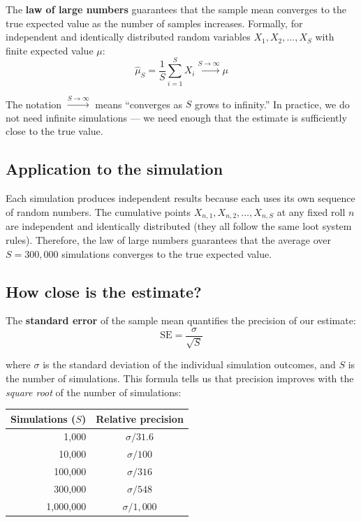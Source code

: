 \documentclass[11pt,a4paper]{article}
\theoremstyle{remark}
\begin{document}
The \textbf{law of large numbers} guarantees that the sample mean converges to the true expected value as the number of samples increases. Formally, for independent and identically distributed random variables $X_1, X_2, \ldots, X_S$ with finite expected value $\mu$:
\[
\hat{\mu}_S = \frac{1}{S} \sum_{i=1}^{S} X_i \xrightarrow{S \to \infty} \mu
\]

The notation $\xrightarrow{S \to \infty}$ means ``converges as $S$ grows to infinity.'' In practice, we do not need infinite simulations --- we need enough that the estimate is sufficiently close to the true value.

\subsection{Application to the simulation}

Each simulation produces independent results because each uses its own sequence of random numbers. The cumulative points $X_{n,1}, X_{n,2}, \ldots, X_{n,S}$ at any fixed roll $n$ are independent and identically distributed (they all follow the same loot system rules). Therefore, the law of large numbers guarantees that the average over $S = 300{,}000$ simulations converges to the true expected value.

\subsection{How close is the estimate?}

The \textbf{standard error} of the sample mean quantifies the precision of our estimate:
\[
\text{SE} = \frac{\sigma}{\sqrt{S}}
\]

where $\sigma$ is the standard deviation of the individual simulation outcomes, and $S$ is the number of simulations. This formula tells us that precision improves with the \emph{square root} of the number of simulations:

\begin{center}
\begin{tabular}{@{}rc@{}}
\toprule
Simulations ($S$) & Relative precision \\
\midrule
1{,}000    & $\sigma / 31.6$ \\
10{,}000   & $\sigma / 100$ \\
100{,}000  & $\sigma / 316$ \\
300{,}000  & $\sigma / 548$ \\
1{,}000{,}000 & $\sigma / 1{,}000$ \\
\bottomrule
\end{tabular}
\end{center}
\end{document}
